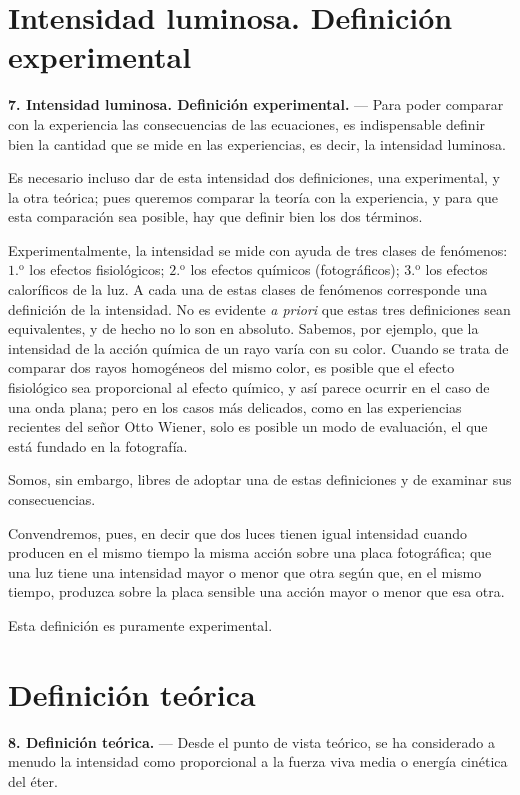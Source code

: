 \section{Intensidad luminosa. Definición experimental}

\noindent\textbf{7. Intensidad luminosa. Definición experimental.} — Para
poder comparar con la experiencia las consecuencias de las ecuaciones, es
indispensable definir bien la cantidad que se mide en las experiencias, es
decir, la intensidad luminosa.

Es necesario incluso dar de esta intensidad dos definiciones, una
experimental, y la otra teórica; pues queremos comparar la teoría con la
experiencia, y para que esta comparación sea posible, hay que definir bien
los dos términos.

Experimentalmente, la intensidad se mide con ayuda de tres clases de
fenómenos: $1.^{\text{o}}$ los efectos fisiológicos; $2.^{\text{o}}$ los
efectos químicos (fotográficos); $3.^{\text{o}}$ los efectos caloríficos de
la luz. A cada una de estas clases de fenómenos corresponde una definición
de la intensidad. No es evidente \emph{a priori} que estas tres
definiciones sean equivalentes, y de hecho no lo son en absoluto. Sabemos,
por ejemplo, que la intensidad de la acción química de un rayo varía con su
color. Cuando se trata de comparar dos rayos homogéneos del mismo color, es
posible que el efecto fisiológico sea proporcional al efecto químico, y
así parece ocurrir en el caso de una onda plana; pero en los casos más
delicados, como en las experiencias recientes del señor Otto Wiener, solo
es posible un modo de evaluación, el que está fundado en la fotografía.

Somos, sin embargo, libres de adoptar una de estas definiciones y de
examinar sus consecuencias.

Convendremos, pues, en decir que dos luces tienen igual intensidad cuando
producen en el mismo tiempo la misma acción sobre una placa fotográfica;
que una luz tiene una intensidad mayor o menor que otra según que, en el
mismo tiempo, produzca sobre la placa sensible una acción mayor o menor
que esa otra.

Esta definición es puramente experimental.

\section{Definición teórica}

\noindent\textbf{8. Definición teórica.} — Desde el punto de vista
teórico, se ha considerado a menudo la intensidad como proporcional a la
fuerza viva media o energía cinética del éter.

